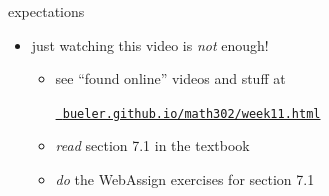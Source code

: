 \documentclass[urlcolor=blue,dvipsnames]{beamer}
\begin{document}
\begin{frame}{expectations}

\begin{itemize}
\item just watching this video is \emph{not} enough!
     \begin{itemize}
     \item see ``found online'' videos and stuff at

     \centerline{\href{https://bueler.github.io/math302/week10.html}{\tt \color{cyan} bueler.github.io/math302/week11.html}}
     \item \emph{read} section 7.1 in the textbook
     \item \emph{do} the WebAssign exercises for section 7.1
     \end{itemize}
\end{itemize}
\end{frame}
\end{document}
